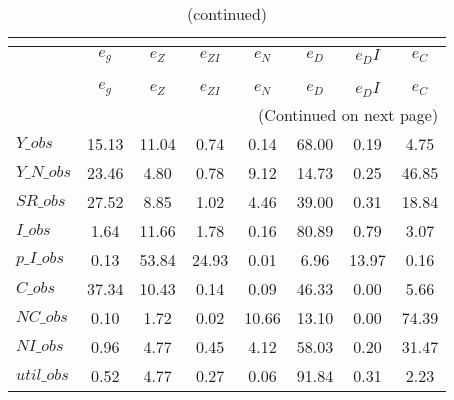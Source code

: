  
\begin{center}
\begin{longtable}{lccccccc} 
\caption{VARIANCE DECOMPOSITION (in percent)}\\
 \label{Table:th_var_decomp_uncond}\\
\toprule 
$           $	 & 	 $       {e_g}$	 & 	 $       {e_Z}$	 & 	 $    {e_{ZI}}$	 & 	 $       {e_N}$	 & 	 $       {e_D}$	 & 	 $      {e_DI}$	 & 	 $       {e_C}$\\
\midrule \endfirsthead 
\caption{(continued)}\\
 \toprule \\ 
$           $	 & 	 $       {e_g}$	 & 	 $       {e_Z}$	 & 	 $    {e_{ZI}}$	 & 	 $       {e_N}$	 & 	 $       {e_D}$	 & 	 $      {e_DI}$	 & 	 $       {e_C}$\\
\midrule \endhead 
\midrule \multicolumn{8}{r}{(Continued on next page)} \\ \bottomrule \endfoot 
\bottomrule \endlastfoot 
$Y\_obs     $	 & 	       15.13	 & 	       11.04	 & 	        0.74	 & 	        0.14	 & 	       68.00	 & 	        0.19	 & 	        4.75 \\ 
$Y\_N\_obs  $	 & 	       23.46	 & 	        4.80	 & 	        0.78	 & 	        9.12	 & 	       14.73	 & 	        0.25	 & 	       46.85 \\ 
$SR\_obs    $	 & 	       27.52	 & 	        8.85	 & 	        1.02	 & 	        4.46	 & 	       39.00	 & 	        0.31	 & 	       18.84 \\ 
$I\_obs     $	 & 	        1.64	 & 	       11.66	 & 	        1.78	 & 	        0.16	 & 	       80.89	 & 	        0.79	 & 	        3.07 \\ 
$p\_I\_obs  $	 & 	        0.13	 & 	       53.84	 & 	       24.93	 & 	        0.01	 & 	        6.96	 & 	       13.97	 & 	        0.16 \\ 
$C\_obs     $	 & 	       37.34	 & 	       10.43	 & 	        0.14	 & 	        0.09	 & 	       46.33	 & 	        0.00	 & 	        5.66 \\ 
$NC\_obs    $	 & 	        0.10	 & 	        1.72	 & 	        0.02	 & 	       10.66	 & 	       13.10	 & 	        0.00	 & 	       74.39 \\ 
$NI\_obs    $	 & 	        0.96	 & 	        4.77	 & 	        0.45	 & 	        4.12	 & 	       58.03	 & 	        0.20	 & 	       31.47 \\ 
$util\_obs  $	 & 	        0.52	 & 	        4.77	 & 	        0.27	 & 	        0.06	 & 	       91.84	 & 	        0.31	 & 	        2.23 \\ 

\end{longtable}
\end{center}
